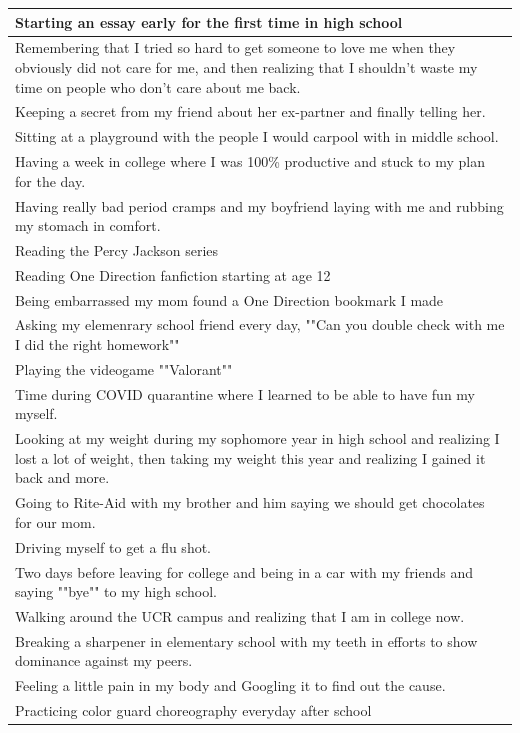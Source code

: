 \documentclass[
  .7em,
  letterpaper,
  DIV=11,
  numbers=noendperiod]{scrartcl}
\begin{document}
\begin{table}
\begin{tabular}{l}
\hline
Starting an essay early for the first time in high school\\
\hline
Remembering that I tried so hard to get someone to love me when they obviously did not care for me, and then realizing that I shouldn't waste my time on people who don't care about me back.\\
\hline
Keeping a secret from my friend about her ex-partner and finally telling her.\\
\hline
Sitting at a playground with the people I would carpool with in middle school.\\
\hline
Having a week in college where I was 100\% productive and stuck to my plan for the day.\\
\hline
Having really bad period cramps and my boyfriend laying with me and rubbing my stomach in comfort.\\
\hline
Reading the Percy Jackson series\\
\hline
Reading One Direction fanfiction starting at age 12\\
\hline
Being embarrassed my mom found a One Direction bookmark I made\\
\hline
Asking my elemenrary school friend every day, ""Can you double check with me I did the right homework""\\
\hline
Playing the videogame ""Valorant""\\
\hline
Time during COVID quarantine where I learned to be able to have fun my myself.\\
\hline
Looking at my weight during my sophomore year in high school and realizing I lost a lot of weight, then taking my weight this year and realizing I gained it back and more.\\
\hline
Going to Rite-Aid with my brother and him saying we should get chocolates for our mom.\\
\hline
Driving myself to get a flu shot.\\
\hline
Two days before leaving for college and being in a car with my friends and saying ""bye"" to my high school.\\
\hline
Walking around the UCR campus and realizing that I am in college now.\\
\hline
Breaking a sharpener in elementary school with my teeth in efforts to show dominance against my peers.\\
\hline
Feeling a little pain in my body and Googling it to find out the cause.\\
\hline
Practicing color guard choreography everyday after school\\

\end{tabular}
\end{table}
\end{document}
